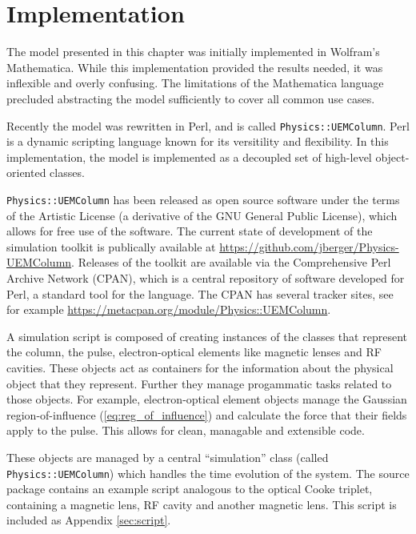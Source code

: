 \section{Implementation}



The model presented in this chapter was initially implemented in Wolfram's Mathematica.
While this implementation provided the results needed, it was inflexible and overly confusing.
The limitations of the Mathematica language precluded abstracting the model sufficiently to cover all common use cases.

Recently the model was rewritten in Perl, and is called \verb!Physics::UEMColumn!.
Perl is a dynamic scripting language known for its versitility and flexibility.
In this implementation, the model is implemented as a decoupled set of high-level object-oriented classes.

\verb!Physics::UEMColumn! has been released as open source software under the terms of the Artistic License (a derivative of the GNU General Public License), which allows for free use of the software.
The current state of development of the simulation toolkit is publically available at \url{https://github.com/jberger/Physics-UEMColumn}.
Releases of the toolkit are available via the Comprehensive Perl Archive Network (CPAN), which is a central repository of software developed for Perl, a standard tool for the language.
The CPAN has several tracker sites, see for example \url{https://metacpan.org/module/Physics::UEMColumn}.

A simulation script is composed of creating instances of the classes that represent the column, the pulse, electron-optical elements like magnetic lenses and RF cavities.
These objects act as containers for the information about the physical object that they represent.
Further they manage progammatic tasks related to those objects.
For example, electron-optical element objects manage the Gaussian region-of-influence (\ref{eq:reg_of_influence}) and calculate the force that their fields apply to the pulse.
This allows for clean, managable and extensible code.

These objects are managed by a central ``simulation'' class (called \verb!Physics::UEMColumn!) which handles the time evolution of the system.
The source package contains an example script analogous to the optical Cooke triplet, containing a magnetic lens, RF cavity and another magnetic lens.
This script is included as Appendix \ref{sec:script}.

